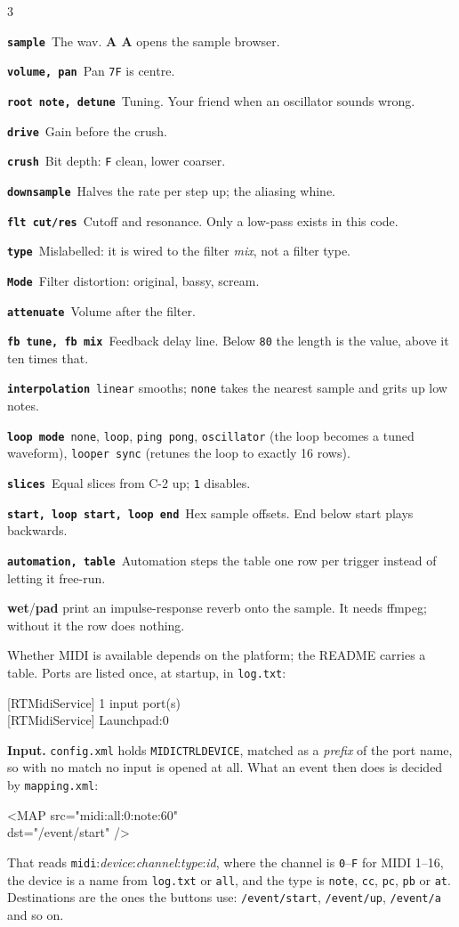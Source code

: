 \documentclass[8pt,a4paper]{extarticle}
\newcommand{\sechead}[1]{%
  \par\addvspace{1.5mm}%
  {\parfillskip=0pt\noindent{\small\bfseries\color{accent}#1}%
   \quad{\color{rule}\hrulefill}\par}%
  \addvspace{0.8mm}}
\newcommand{\entry}[2]{\par\addvspace{0.28mm}\noindent\hangindent=2.4mm\hangafter=1 #1~#2\par}
\newcommand{\ctl}[2]{\entry{\texttt{\textbf{#1}}}{#2}}
\newcommand{\sq}[1]{\texttt{#1}}
\newcommand{\kw}[1]{\textbf{#1}}
\begin{document}
\begin{multicols}{3}
\sechead{Instrument}
\ctl{sample}{The wav. \kw{A A} opens the sample browser.}
\ctl{volume, pan}{Pan \sq{7F} is centre.}
\ctl{root note, detune}{Tuning. Your friend when an oscillator sounds wrong.}
\ctl{drive}{Gain before the crush.}
\ctl{crush}{Bit depth: \sq{F} clean, lower coarser.}
\ctl{downsample}{Halves the rate per step up; the aliasing whine.}
\ctl{flt cut/res}{Cutoff and resonance. Only a low-pass exists in this code.}
\ctl{type}{Mislabelled: it is wired to the filter \emph{mix}, not a filter type.}
\ctl{Mode}{Filter distortion: original, bassy, scream.}
\ctl{attenuate}{Volume after the filter.}
\ctl{fb tune, fb mix}{Feedback delay line. Below \sq{80} the length is the value,
above it ten times that.}
\ctl{interpolation}{\sq{linear} smooths; \sq{none} takes the nearest sample and
grits up low notes.}
\ctl{loop mode}{\sq{none}, \sq{loop}, \sq{ping pong}, \sq{oscillator} (the loop
becomes a tuned waveform), \sq{looper sync} (retunes the loop to exactly 16
rows).}
\ctl{slices}{Equal slices from C-2 up; \sq{1} disables.}
\ctl{start, loop start, loop end}{Hex sample offsets. End below start plays
backwards.}
\ctl{automation, table}{Automation steps the table one row per trigger instead
of letting it free-run.}

\kw{wet}/\kw{pad} print an impulse-response reverb onto the sample. It needs
ffmpeg; without it the row does nothing.

\sechead{MIDI}
Whether MIDI is available depends on the platform; the README carries a table.
Ports are listed once, at startup, in \sq{log.txt}:

{\scriptsize\ttfamily
\phantom{x}[RTMidiService] 1 input port(s)\\
\phantom{x}[RTMidiService] \phantom{1} Launchpad:0\par}

\kw{Input.} \sq{config.xml} holds \sq{MIDICTRLDEVICE}, matched as a
\emph{prefix} of the port name, so with no match no input is opened at all.
What an event then does is decided by \sq{mapping.xml}:

{\scriptsize\ttfamily
\phantom{x}\textless{}MAP src="midi:all:0:note:60"\\
\phantom{xxxxxx}dst="/event/start" /\textgreater\par}

That reads \sq{midi}:\emph{device}:\emph{channel}:\emph{type}:\emph{id}, where
the channel is \sq{0}--\sq{F} for MIDI 1--16, the device is a name from
\sq{log.txt} or \sq{all}, and the type is \sq{note}, \sq{cc}, \sq{pc}, \sq{pb}
or \sq{at}. Destinations are the ones the buttons use: \sq{/event/start},
\sq{/event/up}, \sq{/event/a} and so on.


\end{multicols}
\end{document}
